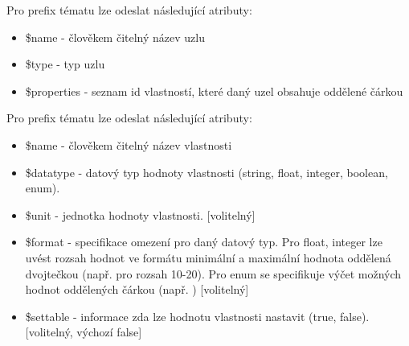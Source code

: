 Pro prefix tématu  lze odeslat následující atributy:
\begin{itemize}
    \item \$name - člověkem čitelný název uzlu
    \item \$type - typ uzlu
    \item \$properties - seznam id vlastností, které daný uzel obsahuje oddělené čárkou
\end{itemize}

Pro prefix tématu  lze odeslat následující atributy:
\begin{itemize}
    \item \$name - člověkem čitelný název vlastnosti
    \item \$datatype - datový typ hodnoty vlastnosti (string, float, integer, boolean, enum).
    \item \$unit - jednotka hodnoty vlastnosti. [volitelný]
    \item \$format - specifikace omezení pro daný datový typ. Pro float, integer lze uvést rozsah hodnot ve formátu minimální a maximální hodnota oddělená dvojtečkou (např.  pro rozsah 10-20). Pro enum se specifikuje výčet možných hodnot oddělených čárkou (např. ) [volitelný]
    \item \$settable - informace zda lze hodnotu vlastnosti nastavit (true, false). [volitelný, výchozí false]
\end{itemize}



